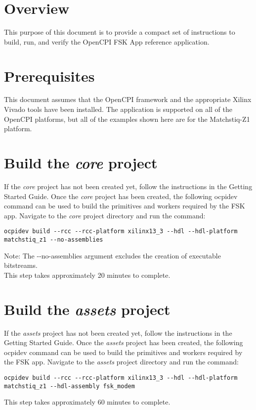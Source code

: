 \newpage
\begin{flushleft}
\section{Overview}
This purpose of this document is to provide a compact set of instructions to build, run, and verify the OpenCPI FSK App reference application.

\section{Prerequisites}
This document assumes that the OpenCPI framework and the appropriate  Xilinx Vivado tools have been installed. The application is supported on all of the OpenCPI platforms, but all of the examples shown here are for the Matchstiq-Z1 platform.

\section{Build the \textit{core} project}
If the \textit{core} project has not been created yet, follow the instructions in the Getting Started Guide. Once the \textit{core} project has been created, the following ocpidev command can be used to build the primitives and workers required by the FSK app. Navigate to the \textit{core} project directory and run the command:
\begin{verbatim}
ocpidev build --rcc --rcc-platform xilinx13_3 --hdl --hdl-platform matchstiq_z1 --no-assemblies
\end{verbatim}
Note: The -\/-no-assemblies argument excludes the creation of executable bitstreams.\\
This step takes approximately 20 minutes to complete.\\

\section{Build the \textit{assets} project}
If the \textit{assets} project has not been created yet, follow the instructions in the Getting Started Guide. Once the \textit{assets} project has been created, the following ocpidev command can be used to build the primitives and workers required by the FSK app. Navigate to the \textit{assets} project directory and run the command:
\begin{verbatim}
ocpidev build --rcc --rcc-platform xilinx13_3 --hdl --hdl-platform matchstiq_z1 --hdl-assembly fsk_modem
\end{verbatim}
This step takes approximately 60 minutes to complete.


\end{flushleft}
